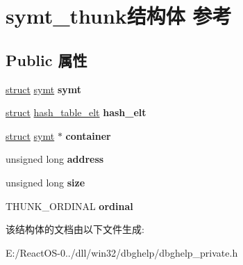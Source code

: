 \hypertarget{structsymt__thunk}{}\section{symt\+\_\+thunk结构体 参考}
\label{structsymt__thunk}
\subsection*{Public 属性}
\begin{DoxyCompactItemize}
\item 
\mbox{\label{structsymt__thunk_a94a6462cae26cbf6e538b3e8b55ec4e1}} 
\hyperlink{interfacestruct}{struct} \hyperlink{structsymt}{symt} {\bfseries symt}
\item 
\mbox{\label{structsymt__thunk_ac56cfe77e5712358298958fee93c7228}} 
\hyperlink{interfacestruct}{struct} \hyperlink{structhash__table__elt}{hash\+\_\+table\+\_\+elt} {\bfseries hash\+\_\+elt}
\item 
\mbox{\label{structsymt__thunk_a2770ef2679848faa6aafb570ce2b8a47}} 
\hyperlink{interfacestruct}{struct} \hyperlink{structsymt}{symt} $\ast$ {\bfseries container}
\item 
\mbox{\label{structsymt__thunk_a74673eb775a0d07753f660dc1c08cf37}} 
unsigned long {\bfseries address}
\item 
\mbox{\label{structsymt__thunk_a1f632c944b8459686b82658edfd0d0ee}} 
unsigned long {\bfseries size}
\item 
\mbox{\label{structsymt__thunk_afd8ff548590062a74fd20dcdaf42329f}} 
T\+H\+U\+N\+K\+\_\+\+O\+R\+D\+I\+N\+AL {\bfseries ordinal}
\end{DoxyCompactItemize}


该结构体的文档由以下文件生成\+:\begin{DoxyCompactItemize}
\item 
E\+:/\+React\+O\+S-\/0../dll/win32/dbghelp/dbghelp\+\_\+private.\+h\end{DoxyCompactItemize}
